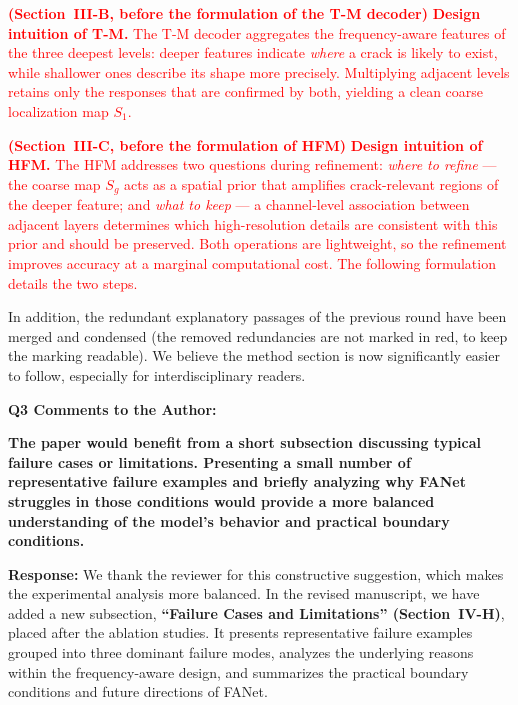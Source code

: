 \documentclass[lettersize,journal,onecolumn,12pt]{IEEEtran}
\begin{document}
\textcolor{red}{
\textbf{(Section~III-B, before the formulation of the T-M decoder)}
\textbf{Design intuition of T-M.} The T-M decoder aggregates the frequency-aware features of the three deepest
levels: deeper features indicate \emph{where} a crack is likely to exist, while shallower ones describe its shape
more precisely. Multiplying adjacent levels retains only the responses that are confirmed by both, yielding a clean
coarse localization map $S_1$.
}

\textcolor{red}{
\textbf{(Section~III-C, before the formulation of HFM)}
\textbf{Design intuition of HFM.} The HFM addresses two questions during refinement: \emph{where to refine} --- the
coarse map $S_g$ acts as a spatial prior that amplifies crack-relevant regions of the deeper feature; and \emph{what
to keep} --- a channel-level association between adjacent layers determines which high-resolution details are
consistent with this prior and should be preserved. Both operations are lightweight, so the refinement improves
accuracy at a marginal computational cost. The following formulation details the two steps.
}

In addition, the redundant explanatory passages of the previous round have been merged and condensed (the removed
redundancies are not marked in red, to keep the marking readable). We believe the method section is now
significantly easier to follow, especially for interdisciplinary readers.\\[10pt]



{\color{BlueGreen} \textbf{Q3 Comments to the Author:}

\textbf{The paper would benefit from a short subsection discussing typical failure cases or limitations. Presenting a
small number of representative failure examples and briefly analyzing why FANet struggles in those conditions would
provide a more balanced understanding of the model's behavior and practical boundary conditions.}}

\textbf{Response:}
We thank the reviewer for this constructive suggestion, which makes the experimental analysis more balanced.
In the revised manuscript, we have added a new subsection, \textbf{``Failure Cases and Limitations''
(Section~IV-H)}, placed after the ablation studies. It presents representative failure examples grouped into three
dominant failure modes, analyzes the underlying reasons within the frequency-aware design, and summarizes the
practical boundary conditions and future directions of FANet.
\end{document}
